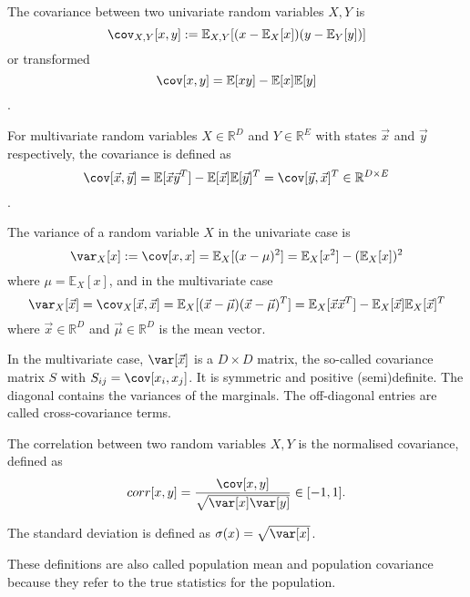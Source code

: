 The covariance between two univariate random variables $X, Y$ is
\begin{equation*}
    \cov_{X, Y}[x, y] :=
        \mathbb{E}_{X, Y}[(x - \mathbb{E}_X[x]) (y - \mathbb{E}_Y[y])]
\end{equation*}
or transformed
\begin{equation*}
    \cov[x, y] = \mathbb{E}[xy] - \mathbb{E}[x]\mathbb{E}[y]
\end{equation*}.

For multivariate random variables
$X \in \mathbb{R}^D$ and $Y \in \mathbb{R}^E$
with states $\vec{x}$ and $\vec{y}$ respectively,
the covariance is defined as
\begin{equation*}
    \cov[\vec{x}, \vec{y}]
    = \mathbb{E}[\vec{x}\vec{y}^T] - \mathbb{E}[\vec{x}]\mathbb{E}[\vec{y}]^T
    = \cov[\vec{y}, \vec{x}]^T
    \in \mathbb{R}^{D \times E}
\end{equation*}.

The variance of a random variable $X$ in the univariate case is
\begin{equation*}
    \var_X[x] := \cov[x, x] = \mathbb{E}_X[(x - \mu)^2]
    = \mathbb{E}_X[x^2] - (\mathbb{E}_X[x])^2
\end{equation*}
where $\mu = \mathbb{E}_X[x]$,
and in the multivariate case
\begin{equation*}
    \var_X[\vec{x}] = \cov_X[\vec{x}, \vec{x}]
    = \mathbb{E}_X[(\vec{x} - \vec{\mu })(\vec{x} - \vec{\mu })^T]
    = \mathbb{E}_X[\vec{x}\vec{x}^T] - \mathbb{E}_X[\vec{x}]\mathbb{E}_X[\vec{x}]^T
\end{equation*}
where $\vec{x} \in \mathbb{R}^D$ and $\vec{\mu} \in \mathbb{R}^D$
is the mean vector.

In the multivariate case, $\var[\vec{x}]$ is a $D \times D$ matrix,
the so-called covariance matrix $S$ with
$S_{ij} = \cov[x_i, x_j]$.
It is symmetric and positive (semi)definite.
The diagonal contains the variances of the marginals.
The off-diagonal entries are called cross-covariance terms.

The correlation between two random variables $X, Y$ is the normalised
covariance, defined as
\begin{equation*}
    corr[x, y] = \frac{\cov[x, y]}{\sqrt{\var[x]\var[y]}}
    \in [-1, 1].
\end{equation*}

The standard deviation is defined as
$\sigma(x) = \sqrt{\var[x]}$.

These definitions are also called population mean and population
covariance because they refer to the true statistics for the population.

